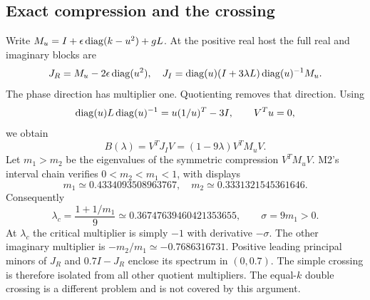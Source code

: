 \documentclass[11pt,a4paper]{article}
\begin{document}
\subsection{Exact compression and the crossing}
Write $M_u=I+\epsilon\operatorname{diag}(k-u^2)+gL$. At the positive real host the full real and imaginary blocks are
\begin{equation}
 J_R=M_u-2\epsilon\operatorname{diag}(u^2),\quad
 J_I=\operatorname{diag}(u)(I+3\lambda L)\operatorname{diag}(u)^{-1}M_u.\label{eq:linear}
\end{equation}
The phase direction has multiplier one. Quotienting removes that direction. Using
\[\operatorname{diag}(u)L\operatorname{diag}(u)^{-1}=u(1/u)^T-3I,\qquad V^Tu=0,\]
we obtain
\begin{equation}
 B(\lambda)=V^TJ_IV=(1-9\lambda)V^TM_uV.\label{eq:compression}
\end{equation}
Let $m_1>m_2$ be the eigenvalues of the symmetric compression $V^TM_uV$. M2's interval chain verifies $0<m_2<m_1<1$, with displays
\begin{equation}
 m_1\simeq0.4334093508963767,\quad m_2\simeq0.3331321545361646.
\end{equation}
Consequently
\begin{equation}
 \lambda_c=\frac{1+1/m_1}{9}\simeq0.36747639460421353655,\qquad \sigma=9m_1>0.\label{eq:critical}
\end{equation}
At $\lambda_c$ the critical multiplier is simply $-1$ with derivative $-\sigma$. The other imaginary multiplier is $-m_2/m_1\simeq-0.7686316731$. Positive leading principal minors of $J_R$ and $0.7I-J_R$ enclose its spectrum in $(0,0.7)$. The simple crossing is therefore isolated from all other quotient multipliers. The equal-$k$ double crossing is a different problem and is not covered by this argument.
\end{document}
